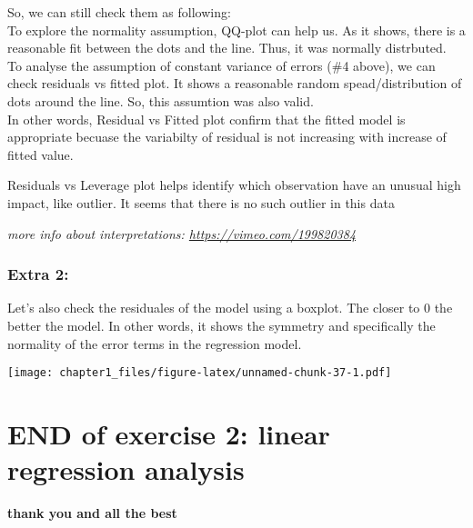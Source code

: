 \documentclass[
]{article}
\newenvironment{Shaded}{\begin{snugshade}}{\end{snugshade}}
\newcommand{\AttributeTok}[1]{\textcolor[rgb]{0.77,0.63,0.00}{#1}}
\newcommand{\FunctionTok}[1]{\textcolor[rgb]{0.00,0.00,0.00}{#1}}
\newcommand{\NormalTok}[1]{#1}
\newcommand{\SpecialCharTok}[1]{\textcolor[rgb]{0.00,0.00,0.00}{#1}}
\newcommand{\StringTok}[1]{\textcolor[rgb]{0.31,0.60,0.02}{#1}}
\begin{document}
So, we can still check them as following:\\
To explore the normality assumption, QQ-plot can help us. As it shows,
there is a reasonable fit between the dots and the line. Thus, it was
normally distrbuted.\\
To analyse the assumption of constant variance of errors (\#4 above), we
can check residuals vs fitted plot. It shows a reasonable random
spead/distribution of dots around the line. So, this assumtion was also
valid.\\
In other words, Residual vs Fitted plot confirm that the fitted model is
appropriate becuase the variabilty of residual is not increasing with
increase of fitted value.

Residuals vs Leverage plot helps identify which observation have an
unusual high impact, like outlier. It seems that there is no such
outlier in this data

\emph{more info about interpretations:
\url{https://vimeo.com/199820384}}

\hypertarget{extra-2}{%
\subsubsection{Extra 2:}\label{extra-2}}

Let's also check the residuales of the model using a boxplot. The closer
to 0 the better the model. In other words, it shows the symmetry and
specifically the normality of the error terms in the regression model.

\begin{Shaded}
\end{Shaded}

\texttt{[image: chapter1\_files/figure-latex/unnamed-chunk-37-1.pdf]}

\hypertarget{end-of-exercise-2-linear-regression-analysis}{%
\section{END of exercise 2: linear regression
analysis}\label{end-of-exercise-2-linear-regression-analysis}}

\textbf{thank you and all the best}
\end{document}
